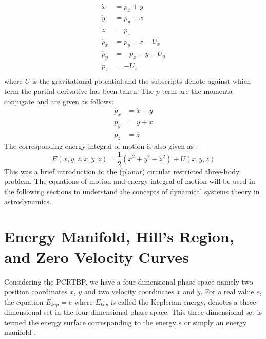 \begin{equation}
\label{hamil_eom}
\begin{aligned}
\dot{x} &= p_x + y \\
\dot{y} &= p_y - x \\
\dot{z} &= p_z \\
\dot{p}_x &= p_y - x - U_x \\
\dot{p}_y &= -p_x - y - U_y \\
\dot{p}_z &= -U_z \\
\end{aligned}
\end{equation}
%
where $U$ is the gravitational potential and the subscripts denote against which term the partial derivative has been taken. The $p$ term are the momenta conjugate and are given as follows:
\begin{equation}
\begin{aligned}
p_x &= \dot{x} - y\\
p_y &= \dot{y}+x \\
p_z &= \dot{z}
\end{aligned}
\end{equation}
%
The corresponding energy integral of motion is also given as \cite{invariant}:
\begin{equation}
\label{energy_int}
E(x,y,z,\dot{x}, \dot{y}, \dot{z}) = \frac{1}{2}(\dot{x}^2 + \dot{y}^2 + \dot{z}^2) + U(x,y,z)
\end{equation}
%
This was a brief introduction to the (planar) circular restricted three-body problem. The equations of motion and energy integral of motion will be used in the following sections to understand the concepts of dynamical systems theory in astrodynamics.

\section{Energy Manifold, Hill's Region, and Zero Velocity Curves}
Considering the \gls{PCRTBP}, we have a four-dimensional phase space namely two position coordinates $x$, $y$ and two velocity coordinates $\dot{x}$ and $\dot{y}$. For a real value $e$, the equation $E_{kep} = e$ where $E_{kep}$ is called the Keplerian energy, denotes a three-dimensional set in the four-dimensional phase space. This three-dimensional set is termed the energy surface corresponding to the energy $e$ or simply an energy manifold \cite{invariant}.

